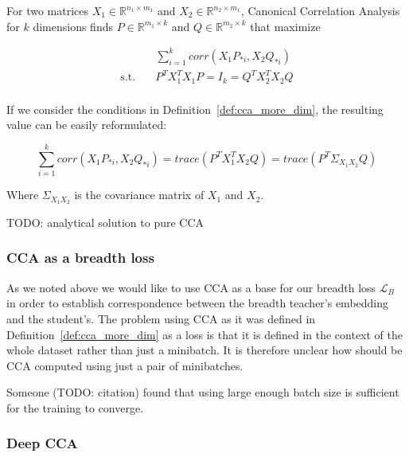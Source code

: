 \begin{defn}\label{def:cca_more_dim}

  For two matrices $X_1 \in \mathbb{R}^{n_1 \times m_1}$ and $X_2 \in
  \mathbb{R}^{n_2 \times m_1}$, Canonical Correlation Analysis for $k$
  dimensions finds $P \in \mathbb{R}^{m_1 \times k}$ and $Q \in \mathbb{R}^{m_2
  \times k}$ that maximize

  \begin{equation}
    \begin{split}
      &\sum_{i = 1}^k corr(X_1P_{*i}, X_2Q_{*i}) \\
      \text{s.t.}\quad &P^TX_1^TX_1P = I_k = Q^TX_2^TX_2Q \\
    \end{split}
  \end{equation}


\end{defn}

If we consider the conditions in Definition~\ref{def:cca_more_dim}, the
resulting value can be easily reformulated:

\begin{equation}
    \sum_{i = 1}^k corr(X_1P_{*i}, X_2Q_{*i}) =
    trace(P^TX_1^TX_2Q) =
    trace(P^T\Sigma_{X_1X_2}Q)
\end{equation}

Where $\Sigma_{X_1X_2}$ is the covariance matrix of $X_1$ and $X_2$.

TODO: analytical solution to pure CCA

\subsubsection{CCA as a breadth loss}

As we noted above we would like to use CCA as a base for our breadth loss
$\mathcal{L}_B$ in order to establish correspondence between the breadth
teacher's embedding and the student's. The problem using CCA as it was defined
in Definition~\ref{def:cca_more_dim} as a loss is that it is defined in the
context of the whole dataset rather than just a minibatch. It is therefore
unclear how should be CCA computed using just a pair of minibatches.

Someone (TODO: citation) found that using large enough batch size is sufficient
for the training to converge.

\subsubsection{Deep CCA}

